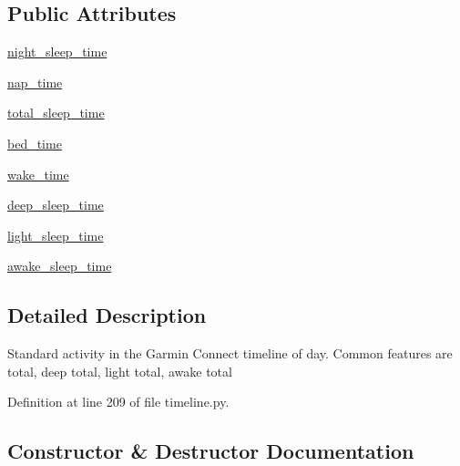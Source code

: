 \subsection*{Public Attributes}
\begin{DoxyCompactItemize}
\item 
\hyperlink{classpygce_1_1models_1_1garmin_1_1timeline_1_1_g_c_day_sleep_a4f8e3dadd2689156a80a21698b426e03}{night\+\_\+sleep\+\_\+time}
\item 
\hyperlink{classpygce_1_1models_1_1garmin_1_1timeline_1_1_g_c_day_sleep_af5aefe888d858cd929d598544802f2a8}{nap\+\_\+time}
\item 
\hyperlink{classpygce_1_1models_1_1garmin_1_1timeline_1_1_g_c_day_sleep_a4942fa038d25a7af4c0793da1b3abf86}{total\+\_\+sleep\+\_\+time}
\item 
\hyperlink{classpygce_1_1models_1_1garmin_1_1timeline_1_1_g_c_day_sleep_a25002c89e8687bc2a88ea5da386332cd}{bed\+\_\+time}
\item 
\hyperlink{classpygce_1_1models_1_1garmin_1_1timeline_1_1_g_c_day_sleep_abb2351f921e38ff370e1ad0822957553}{wake\+\_\+time}
\item 
\hyperlink{classpygce_1_1models_1_1garmin_1_1timeline_1_1_g_c_day_sleep_a95ebbbd000c531843a8a7fa7f8788f72}{deep\+\_\+sleep\+\_\+time}
\item 
\hyperlink{classpygce_1_1models_1_1garmin_1_1timeline_1_1_g_c_day_sleep_a49295ce80915e2012694a35edbf7ad7d}{light\+\_\+sleep\+\_\+time}
\item 
\hyperlink{classpygce_1_1models_1_1garmin_1_1timeline_1_1_g_c_day_sleep_aefd01be519ebb8192b0887941b66eda0}{awake\+\_\+sleep\+\_\+time}
\end{DoxyCompactItemize}


\subsection{Detailed Description}
\begin{DoxyVerb}Standard activity in the Garmin Connect timeline of day.
Common features are total, deep total, light total, awake total
\end{DoxyVerb}
 

Definition at line 209 of file timeline.\+py.



\subsection{Constructor \& Destructor Documentation}
